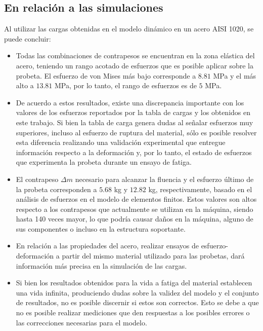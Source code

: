 \subsection{En relación a las simulaciones}
Al utilizar las cargas obtenidas en el modelo dinámico en un acero AISI 1020, se puede concluir:
\begin{itemize}
	\item Todas las combinaciones de contrapesos se encuentran en la zona elástica del acero, teniendo un rango acotado de esfuerzos que es posible aplicar sobre la probeta. El esfuerzo de von Mises más bajo corresponde a $8.81$ MPa y el más alto a $13.81$ MPa, por lo tanto, el rango de esfuerzos es de $5$ MPa. 
	\item De acuerdo a estos resultados, existe una discrepancia importante con los valores de los esfuerzos reportados por la tabla de cargas y los obtenidos en este trabajo. Si bien la tabla de carga genera dudas al señalar esfuerzos muy superiores, incluso al esfuerzo de ruptura del material, sólo es posible resolver esta diferencia realizando una validación experimental que entregue información respecto a la deformación y, por lo tanto, el estado de esfuerzos que experimenta la probeta durante un ensayo de fatiga. 
	\item El contrapeso $\Delta m$ necesario para alcanzar la fluencia y el esfuerzo último de la probeta corresponden a $5.68$ kg y $12.82$ kg, respectivamente, basado en el análisis de esfuerzos en el modelo de elementos finitos. Estos valores son altos respecto a los contrapesos que actualmente se utilizan en la máquina, siendo hasta 140 veces mayor, lo que podría causar daños en la máquina, alguno de sus componentes o incluso en la estructura soportante.
	\item En relación a las propiedades del acero, realizar ensayos de esfuerzo-deformación a partir del mismo material utilizado para las probetas, dará información más precisa en la simulación de las cargas.
	\item Si bien los resultados obtenidos para la vida a fatiga del material establecen una vida infinita, produciendo dudas sobre la validez del modelo y el conjunto de resultados, no es posible discernir si estos son correctos. Esto se debe a que no es posible realizar mediciones que den respuestas a los posibles errores o las correcciones necesarias para el modelo.
\end{itemize}

%

